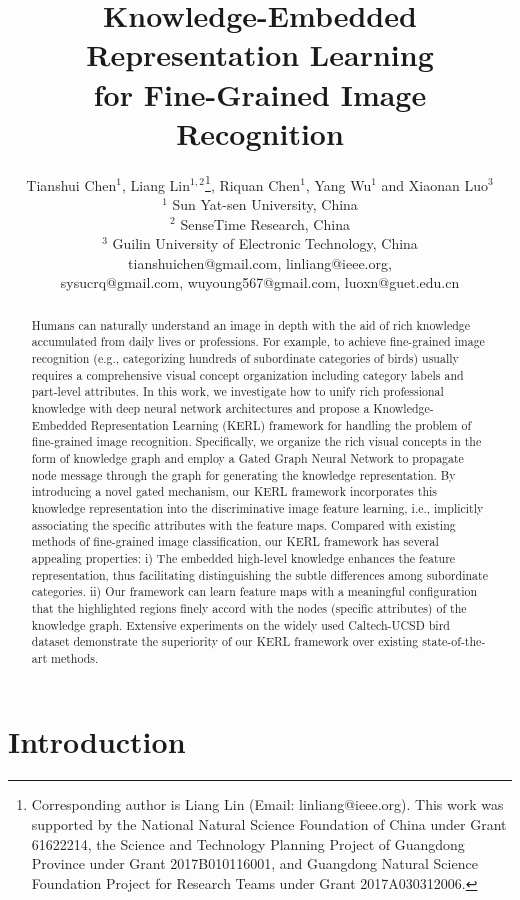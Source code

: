 \documentclass{article}
\title{Knowledge-Embedded Representation Learning \\ for Fine-Grained Image Recognition}
\author{
Tianshui Chen$^1$, 
Liang Lin$^{1,2}$\thanks{\footnotesize Corresponding author is Liang Lin (Email: linliang@ieee.org). This work was supported by the National Natural Science Foundation of China under Grant  61622214, the Science and Technology Planning Project of Guangdong Province under Grant 2017B010116001, and Guangdong Natural Science Foundation Project for Research Teams under Grant 2017A030312006.}, 
Riquan Chen$^1$, 
Yang Wu$^1$
{\normalfont and}  Xiaonan Luo$^3$
\\ 
$^1$ Sun Yat-sen University, China \\
$^2$ SenseTime Research, China\\
$^3$ Guilin University of Electronic Technology, China  \\
%
tianshuichen@gmail.com,
linliang@ieee.org,\\
sysucrq@gmail.com,
wuyoung567@gmail.com,
luoxn@guet.edu.cn
}
\begin{document}
\maketitle

\begin{abstract}
Humans can naturally understand an image in depth with the aid of rich knowledge accumulated from daily lives or professions. For example, to achieve fine-grained image recognition (e.g., categorizing hundreds of subordinate categories of birds) usually requires a comprehensive visual concept organization including category labels and part-level attributes. In this work, we investigate how to unify rich professional knowledge with deep neural network architectures and propose a Knowledge-Embedded Representation Learning (KERL) framework for handling the problem of fine-grained image recognition. Specifically, we organize the rich visual concepts in the form of knowledge graph and employ a Gated Graph Neural Network to propagate node message through the graph for generating the knowledge representation. By introducing a novel gated mechanism, our KERL framework incorporates this knowledge representation into the discriminative image feature learning, i.e., implicitly associating the specific attributes with the feature maps. Compared with existing methods of fine-grained image classification, our KERL framework has several appealing properties: i) The embedded high-level knowledge enhances the feature representation, thus facilitating distinguishing the subtle differences among subordinate categories. ii) Our framework can learn feature maps with a meaningful configuration that the highlighted regions finely accord with the nodes (specific attributes) of the knowledge graph. Extensive experiments on the widely used Caltech-UCSD bird dataset demonstrate the superiority of our KERL framework over existing state-of-the-art methods.
\end{abstract}

\section{Introduction}
\end{document}
